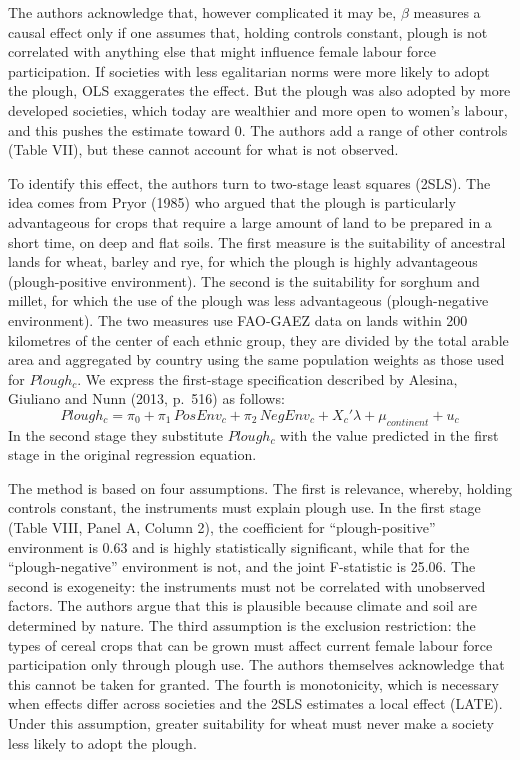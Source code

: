\documentclass[12pt,a4paper]{article}
\begin{document}
The authors acknowledge that, however complicated it may be, $\beta$ measures a causal effect only if one assumes that, holding controls constant, plough is not correlated with anything else that might influence female labour force participation. If societies with less egalitarian norms were more likely to adopt the plough, OLS exaggerates the effect. But the plough was also adopted by more developed societies, which today are wealthier and more open to women's labour, and this pushes the estimate toward 0. The authors add a range of other controls (Table VII), but these cannot account for what is not observed.

To identify this effect, the authors turn to two-stage least squares (2SLS). The idea comes from Pryor (1985) who argued that the plough is particularly advantageous for crops that require a large amount of land to be prepared in a short time, on deep and flat soils. The first measure is the suitability of ancestral lands for wheat, barley and rye, for which the plough is highly advantageous (plough-positive environment). The second is the suitability for sorghum and millet, for which the use of the plough was less advantageous (plough-negative environment). The two measures use FAO-GAEZ data on lands within 200 kilometres of the center of each ethnic group, they are divided by the total arable area and aggregated by country using the same population weights as those used for $Plough_c$. We express the first-stage specification described by Alesina, Giuliano and Nunn (2013, p.~516) as follows:
\begin{equation}\label{eq:firststage}
  Plough_c = \pi_0 + \pi_1\, PosEnv_c + \pi_2\, NegEnv_c + X_c'\lambda + \mu_{continent} + u_c
\end{equation}
In the second stage they substitute $Plough_c$ with the value predicted in the first stage in the original regression equation.

The method is based on four assumptions. The first is relevance, whereby, holding controls constant, the instruments must explain plough use. In the first stage (Table VIII, Panel A, Column 2), the coefficient for ``plough-positive'' environment is 0.63 and is highly statistically significant, while that for the ``plough-negative'' environment is not, and the joint F-statistic is 25.06. The second is exogeneity: the instruments must not be correlated with unobserved factors. The authors argue that this is plausible because climate and soil are determined by nature. The third assumption is the exclusion restriction: the types of cereal crops that can be grown must affect current female labour force participation only through plough use. The authors themselves acknowledge that this cannot be taken for granted. The fourth is monotonicity, which is necessary when effects differ across societies and the 2SLS estimates a local effect (LATE). Under this assumption, greater suitability for wheat must never make a society less likely to adopt the plough.
\end{document}
